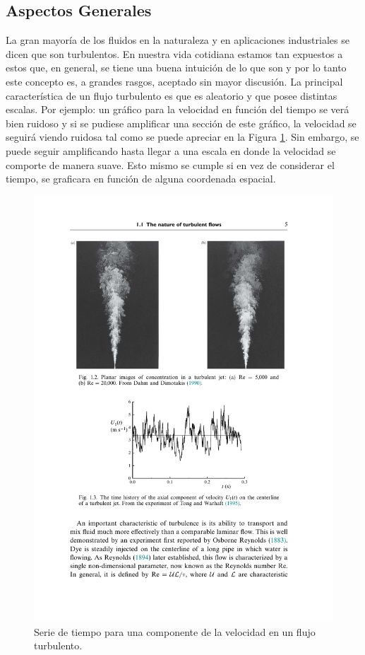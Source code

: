 \subsection{Aspectos Generales}
La gran mayoría de los fluidos en la naturaleza y en aplicaciones industriales se dicen que son turbulentos. En nuestra vida cotidiana estamos tan expuestos a estos que, en general, se tiene una buena intuición de lo que son y por lo tanto este concepto es, a grandes rasgos, aceptado sin mayor discusión. La principal característica de un flujo turbulento es que es aleatorio y que posee distintas escalas. Por ejemplo: un gráfico para la velocidad en función del tiempo se verá bien ruidoso y si se pudiese amplificar una sección de este gráfico, la velocidad se seguirá viendo ruidosa tal como se puede apreciar en la Figura \ref{fig:03_turbulent}. Sin embargo, se puede seguir amplificando hasta llegar a una escala en donde la velocidad se comporte de manera suave. Esto mismo se cumple si en vez de considerar el tiempo, se graficara en función de alguna coordenada espacial.

\begin{figure}[h!]
	\centering
	\includegraphics[width=0.8\linewidth,trim={4.3cm 7.7cm 4cm 11.5cm},clip]{Imagenes/03/turbulent}
	\caption{Serie de tiempo para una componente de la velocidad en un flujo turbulento.}
	\label{fig:03_turbulent}
\end{figure}

